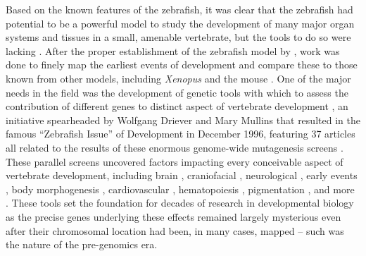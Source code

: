 Based on the known features of the zebrafish, it was clear that the zebrafish had potential to be a powerful model to study the development of many major organ systems and tissues in a small, amenable vertebrate, but the tools to do so were lacking \citep{Bakkers2011}. After the proper establishment of the zebrafish model by \citeauthor{Streisinger1981}, work was done to finely map the earliest events of development and compare these to those known from other models, including \textit{Xenopus} and the mouse \citep{Kimmel1988, Kimmel1989, Kimmel1995}. One of the major needs in the field was the development of genetic tools with which to assess the contribution of different genes to distinct aspect of vertebrate development \citep{Driever1994, Mullins1994}, an initiative spearheaded by Wolfgang Driever and Mary Mullins that resulted in the famous ``Zebrafish Issue'' of Development in December 1996, featuring 37 articles all related to the results of these enormous genome\hyp{}wide mutagenesis screens \citep{Haffter1996, Driever1996, Knapik1996, NussleinVolhard2012, Mullins2021}. These parallel screens uncovered factors impacting every conceivable aspect of vertebrate development, including brain \citep{Schier1996, Heisenberg1996, Jiang1996, Brand1996b, Stemple1996, Odenthal1996a}, craniofacial \citep{Whitfield1996, Malicki1996b, Schilling1996, Piotrowski1996, Neuhauss1996}, neurological \citep{Malicki1996a, FurutaniSeiki1996, Abdelilah1996, Baier1996, Karlstrom1996, Trowe1996}, early events \citep{Kane1996a, Kane1996b}, body morphogenesis \citep{Brand1996a, vanEeden1996a, vanEeden1996b, Hammerschmidt1996a, Mullins1996, Hammerschmidt1996b}, cardiovascular \citep{Stainier1996, Chen1996}, hematopoiesis \citep{Weinstein1996, Ransom1996}, pigmentation \citep{Kelsh1996, Odenthal1996b}, and more \citep{Granato1996, Pack1996}. These tools set the foundation for decades of research in developmental biology as the precise genes underlying these effects remained largely mysterious even after their chromosomal location had been, in many cases, mapped -- such was the nature of the pre\hyp{}genomics era.

